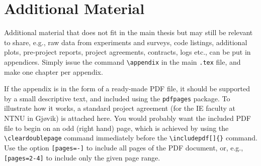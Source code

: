 \chapter{Additional Material}
\label{app:additional}

Additional material that does not fit in the main thesis but may still be relevant to share, e.g., raw data from experiments and surveys, code listings, additional plots, pre-project reports, project agreements, contracts, logs etc., can be put in appendices. Simply issue the command \texttt{\textbackslash appendix} in the main \texttt{.tex} file, and make one chapter per appendix.

If the appendix is in the form of a ready-made PDF file, it should be supported by a small descriptive text, and included using the \texttt{pdfpages} package. To illustrate how it works, a standard project agreement (for the IE faculty at NTNU in Gjøvik) is attached here. You would probably want the included PDF file to begin on an odd (right hand) page, which is achieved by using the \texttt{\textbackslash cleardoublepage} command immediately before the \texttt{\textbackslash includepdf[]\{\}} command. Use the option \texttt{[pages=-]} to include all pages of the PDF document, or, e.g., \texttt{[pages=2-4]} to include only the given page range.

